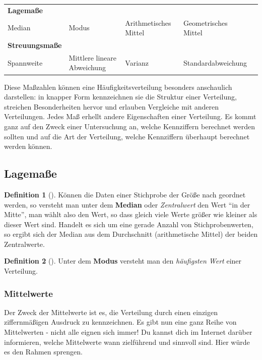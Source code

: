 \documentclass[a4paper, twoside, parskip, 10pt, smallheadings]{scrbook}
\theoremstyle{plain}
\theoremstyle{definition}
\newtheorem{Def}{Definition}%
\newenvironment{fshaded}{%
\def\FrameCommand{\fcolorbox{framecolor}{shadecolor}}%
\MakeFramed {\FrameRestore}}%
{\endMakeFramed}
\newenvironment{fdef}[1][]{\definecolor{shadecolor}{rgb}{1,1,.29}%
\definecolor{framecolor}{rgb}{1,1,0}%
\begin{fshaded}\begin{Def}[#1]}{\end{Def}\end{fshaded}}
\newcommand{\bd}{\begin{fdef}}
\newcommand{\ed}{\end{fdef}}
\begin{document}
\begin{center}
\begin{tabular}{lllll} \hline 
{\bf Lagemaße} &  &  &   \\ 
Median & Modus & Arithmetisches Mittel & Geometrisches Mittel  \\  \hline 
{\bf Streuungsmaße} &  &  &   \\ 
Spannweite & Mittlere lineare Abweichung & Varianz & Standardabweichung \\ \hline 
\end{tabular}
\end{center}


Diese Maßzahlen können eine Häufigkeitsverteilung besonders anschaulich darstellen: in knapper Form kennzeichnen sie die Struktur einer Verteilung, streichen Besonderheiten hervor und erlauben Vergleiche mit anderen Verteilungen. Jedes Maß erhellt andere Eigenschaften einer Verteilung. Es kommt ganz auf den Zweck einer Untersuchung an, welche Kennziffern berechnet werden sollten und auf die Art der Verteilung, welche Kennziffern überhaupt berechnet werden können.




\subsection{Lagema{\ss}e}\label{statlgm}

\bd  K\"{o}nnen die Daten einer Stichprobe der Gr\"{o}{\ss}e nach geordnet werden, so versteht man unter dem {\bf
Median} oder {\it Zentralwert} den Wert "`in der Mitte"', man w\"{a}hlt also den Wert, so dass gleich
viele Werte gr\"{o}{\ss}er wie kleiner als dieser Wert sind. Handelt es sich um eine gerade Anzahl von
Stichprobenwerten, so ergibt sich der Median aus dem Durchschnitt (arithmetische Mittel) der beiden
Zentralwerte. \ed  

\bd  Unter dem {\bf Modus} versteht man den {\it häufigsten Wert} einer Verteilung.\ed  

\subsubsection{Mittelwerte}

Der Zweck der Mittelwerte ist es, die Verteilung durch einen einzigen ziffernmäßigen Ausdruck zu kennzeichnen. Es gibt nun eine ganz Reihe von Mittelwerten - nicht alle eignen sich immer! Du kannst dich im Internet darüber informieren, welche Mittelwerte wann zielführend und sinnvoll sind. Hier würde es den Rahmen sprengen.
\end{document}
